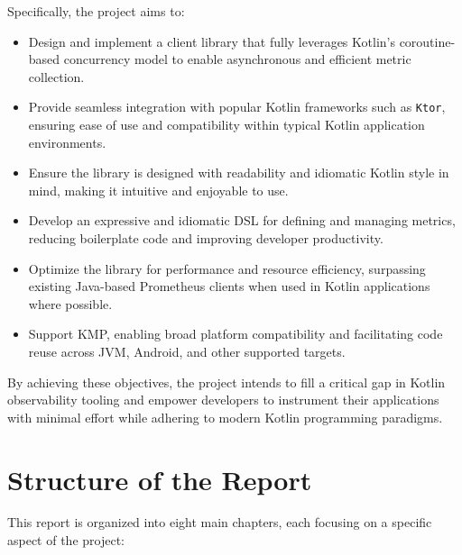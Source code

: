 Specifically, the project aims to:

\begin{itemize}
    \item Design and implement a client library that fully leverages Kotlin’s coroutine-based concurrency model to enable asynchronous and efficient metric collection.
    \item Provide seamless integration with popular Kotlin frameworks such as \texttt{Ktor}, ensuring ease of use and
    compatibility within typical Kotlin application environments.
    \item Ensure the library is designed with readability and idiomatic Kotlin style in mind, making it intuitive and enjoyable to use.
    \item Develop an expressive and idiomatic \ac{DSL} for defining and managing metrics,
    reducing boilerplate code and improving developer productivity.
    \item Optimize the library for performance and resource efficiency, surpassing existing Java-based Prometheus
    clients when used in Kotlin applications where possible.
    \item Support \ac{KMP}, enabling broad platform compatibility and facilitating code reuse across \ac{JVM},
    Android, and
    other supported targets.
\end{itemize}

By achieving these objectives, the project intends to fill a critical gap in Kotlin observability tooling and empower developers to instrument their applications with minimal effort while adhering to modern Kotlin programming paradigms.

\section{Structure of the Report}\label{sec:structure-of-the-report}

This report is organized into eight main chapters, each focusing on a specific aspect of the project:

